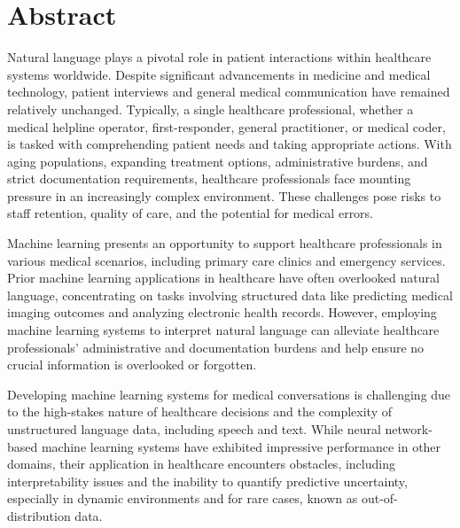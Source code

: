 
\chapter[abstract]{Abstract}

Natural language plays a pivotal role in patient interactions within healthcare systems worldwide. Despite significant advancements in medicine and medical technology, patient interviews and general medical communication have remained relatively unchanged. Typically, a single healthcare professional, whether a medical helpline operator, first-responder, general practitioner, or medical coder, is tasked with comprehending patient needs and taking appropriate actions. With aging populations, expanding treatment options, administrative burdens, and strict documentation requirements, healthcare professionals face mounting pressure in an increasingly complex environment. These challenges pose risks to staff retention, quality of care, and the potential for medical errors.

Machine learning presents an opportunity to support healthcare professionals in various medical scenarios, including primary care clinics and emergency services. Prior machine learning applications in healthcare have often overlooked natural language, concentrating on tasks involving structured data like predicting medical imaging outcomes and analyzing electronic health records. However, employing machine learning systems to interpret natural language can alleviate healthcare professionals' administrative and documentation burdens and help ensure no crucial information is overlooked or forgotten. 

Developing machine learning systems for medical conversations is challenging due to the high-stakes nature of healthcare decisions and the complexity of unstructured language data, including speech and text. While neural network-based machine learning systems have exhibited impressive performance in other domains, their application in healthcare encounters obstacles, including interpretability issues and the inability to quantify predictive uncertainty, especially in dynamic environments and for rare cases, known as out-of-distribution data.

